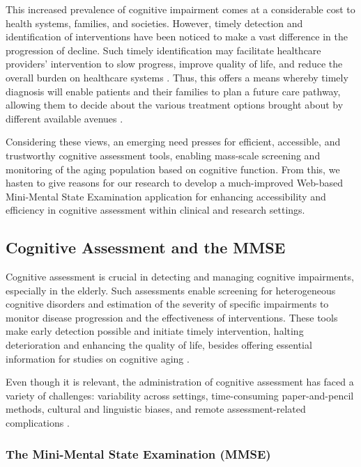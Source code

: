 This increased prevalence of cognitive impairment comes at a considerable cost to health systems, families, and societies. However, timely detection and identification of interventions have been noticed to make a vast difference in the progression of decline. Such timely identification may facilitate healthcare providers' intervention to slow progress, improve quality of life, and reduce the overall burden on healthcare systems \cite{Livingston2020}. Thus, this offers a means whereby timely diagnosis will enable patients and their families to plan a future care pathway, allowing them to decide about the various treatment options brought about by different available avenues \cite{Sperling2011}.

Considering these views, an emerging need presses for efficient, accessible, and trustworthy cognitive assessment tools, enabling mass-scale screening and monitoring of the aging population based on cognitive function. From this, we hasten to give reasons for our research to develop a much-improved Web-based Mini-Mental State Examination application for enhancing accessibility and efficiency in cognitive assessment within clinical and research settings.

\subsection{Cognitive Assessment and the MMSE}

Cognitive assessment is crucial in detecting and managing cognitive impairments, especially in the elderly. Such assessments enable screening for heterogeneous cognitive disorders and estimation of the severity of specific impairments to monitor disease progression and the effectiveness of interventions. These tools make early detection possible and initiate timely intervention, halting deterioration and enhancing the quality of life, besides offering essential information for studies on cognitive aging \cite{Langa2015, Petersen2018, Weintraub2009}.

Even though it is relevant, the administration of cognitive assessment has faced a variety of challenges: variability across settings, time-consuming paper-and-pencil methods, cultural and linguistic biases, and remote assessment-related complications \cite{Prince2013, Cordell2013, Henrich2010, Goldberg2015, Geddes2020, Bilder2020}.

\subsubsection{The Mini-Mental State Examination (MMSE)}

